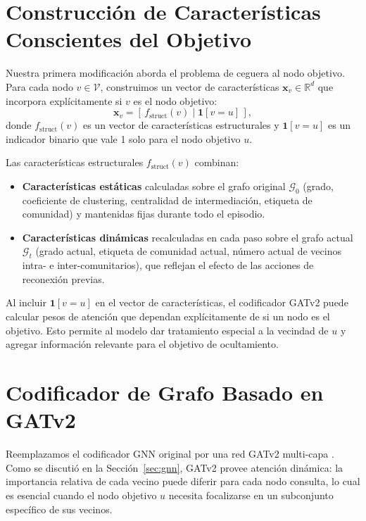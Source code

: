 \documentclass[11pt,a4paper,twoside]{tesis}
\newcommand{\G}{\mathcal{G}}
\newcommand{\V}{\mathcal{V}}
\begin{document}
\section{Construcción de Características Conscientes del Objetivo}
\label{sec:features}

Nuestra primera modificación aborda el problema de ceguera al nodo objetivo. Para cada
nodo $v \in \V$, construimos un vector de características $\mathbf{x}_v \in \mathbb{R}^d$
que incorpora explícitamente si $v$ es el nodo objetivo:
\[
\mathbf{x}_v = \left[\,f_{\mathrm{struct}}(v) \;\Big|\; \mathbf{1}[v = u]\,\right],
\]
donde $f_{\mathrm{struct}}(v)$ es un vector de características estructurales y
$\mathbf{1}[v=u]$ es un indicador binario que vale 1 solo para el nodo objetivo $u$.

Las características estructurales $f_{\mathrm{struct}}(v)$ combinan:
\begin{itemize}
    \item \textbf{Características estáticas} calculadas sobre el grafo original $\G_0$
          (grado, coeficiente de clustering, centralidad de intermediación, etiqueta de
          comunidad) y mantenidas fijas durante todo el episodio.
    \item \textbf{Características dinámicas} recalculadas en cada paso sobre el grafo
          actual $\G_t$ (grado actual, etiqueta de comunidad actual, número actual de
          vecinos intra- e inter-comunitarios), que reflejan el efecto de las acciones
          de reconexión previas.
\end{itemize}

Al incluir $\mathbf{1}[v = u]$ en el vector de características, el codificador GATv2
puede calcular pesos de atención que dependan explícitamente de si un nodo es el
objetivo. Esto permite al modelo dar tratamiento especial a la vecindad de $u$ y agregar
información relevante para el objetivo de ocultamiento.

\section{Codificador de Grafo Basado en GATv2}
\label{sec:codificador}

Reemplazamos el codificador GNN original por una red GATv2 multi-capa \cite{brody2022how}.
Como se discutió en la Sección~\ref{sec:gnn}, GATv2 provee atención dinámica: la
importancia relativa de cada vecino puede diferir para cada nodo consulta, lo cual es
esencial cuando el nodo objetivo $u$ necesita focalizarse en un subconjunto específico
de sus vecinos.
\end{document}
